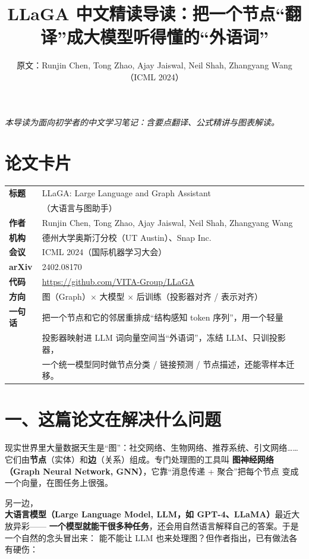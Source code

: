 \documentclass[11pt,UTF8,fontset=fandol]{ctexart}
\title{LLaGA 中文精读导读：把一个节点“翻译”成大模型听得懂的“外语词”}
\author{原文：Runjin Chen, Tong Zhao, Ajay Jaiswal, Neil Shah, Zhangyang Wang（ICML 2024）}
\date{}
\begin{document}
\maketitle
\begin{center}\small\textit{本导读为面向初学者的中文学习笔记：含要点翻译、公式精讲与图表解读。}\end{center}

\section*{论文卡片}
\begin{center}
\begin{tabular}{@{}ll@{}}
\toprule
\textbf{标题} & LLaGA: Large Language and Graph Assistant \\
            & （大语言与图助手） \\
\textbf{作者} & Runjin Chen, Tong Zhao, Ajay Jaiswal, Neil Shah, Zhangyang Wang \\
\textbf{机构} & 德州大学奥斯汀分校（UT Austin）、Snap Inc. \\
\textbf{会议} & ICML 2024（国际机器学习大会） \\
\textbf{arXiv} & 2402.08170 \\
\textbf{代码} & \url{https://github.com/VITA-Group/LLaGA} \\
\textbf{方向} & 图（Graph）$\times$ 大模型 $\times$ 后训练（投影器对齐 / 表示对齐） \\
\textbf{一句话} & 把一个节点和它的邻居重排成“结构感知 token 序列”，用一个轻量\\
              & 投影器映射进 LLM 词向量空间当“外语词”，冻结 LLM、只训投影器，\\
              & 一个统一模型同时做节点分类 / 链接预测 / 节点描述，还能零样本迁移。 \\
\bottomrule
\end{tabular}
\end{center}

\section{一、这篇论文在解决什么问题}

现实世界里大量数据天生是“图”：社交网络、生物网络、推荐系统、引文网络……
它们由\textbf{节点}（实体）和\textbf{边}（关系）组成。专门处理图的工具叫
\textbf{图神经网络（Graph Neural Network, GNN）}，它靠“消息传递 + 聚合”把每个节点
变成一个向量，在图任务上很强。

另一边，\textbf{大语言模型（Large Language Model, LLM，如 GPT-4、LLaMA）}最近大放异彩——
\textbf{一个模型就能干很多种任务}，还会用自然语言解释自己的答案。于是一个自然的念头冒出来：
能不能让 LLM 也来处理图？但作者指出，已有做法各有硬伤：
\end{document}
